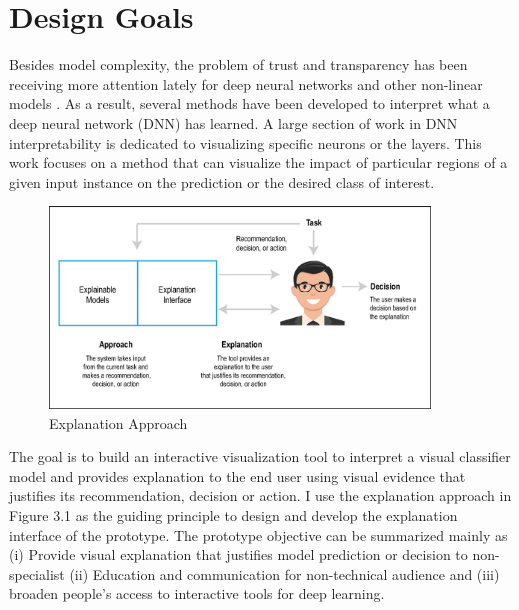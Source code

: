 

\section{Design Goals}

Besides model complexity, the problem of trust and transparency has been receiving more attention lately for deep neural networks and other non-linear models \cite{edseee.839741120170101} \cite{edseee.863755220180101} \cite{S003132031630358220170501}. As a result, several methods have been developed to interpret what a deep neural network (DNN) has learned. A large section of work in DNN interpretability is dedicated to visualizing specific neurons or the layers. This work focuses on a method that can visualize the impact of particular regions of a given input instance on the prediction or the desired class of interest.

\begin{figure}[htbp]
\centering
\includegraphics[width=0.90\textwidth]{images/xai-1.eps}
\caption{Explanation Approach}
\label{fig:explanation-approach}
\end{figure}

The goal is to build an interactive visualization tool to interpret a visual classifier model and provides explanation to the end user using visual evidence that justifies its recommendation, decision or action. I use the explanation approach in Figure 3.1 as the guiding principle to design and develop the explanation interface of the prototype.  The prototype objective can be summarized mainly as (i) Provide visual explanation that justifies model prediction or decision to non-specialist (ii) Education and communication for non-technical audience and (iii) broaden people's access to interactive tools for deep learning.

